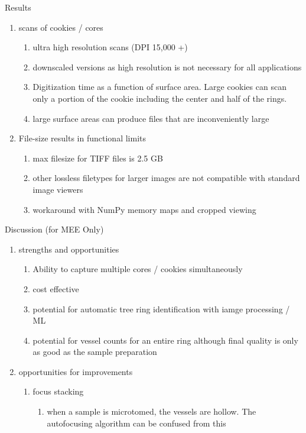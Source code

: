 \documentclass{article}
\begin{document}
\begin{outline}[enumerate]
\item Results
	\begin{enumerate}
	\item scans of cookies / cores
		\begin{enumerate}
		\item ultra high resolution scans (DPI 15,000 +)
		\item downscaled versions as high resolution is not necessary for all applications
		\item Digitization time as a function of surface area. Large cookies can scan only a portion of the cookie including the center and half of the rings.
		\item large surface areas can produce files that are inconveniently large
		\end{enumerate}
	\item File-size results in functional limits 
		\begin{enumerate}
		\item max filesize for TIFF files is 2.5 GB
		\item other lossless filetypes for larger images are not compatible with standard image viewers
		\item workaround with NumPy memory maps and cropped viewing 
		\end{enumerate}
	\end{enumerate}
\item Discussion (for MEE Only)
	\begin{enumerate}
	\item strengths and opportunities
		\begin{enumerate}
		\item  Ability to capture multiple cores / cookies simultaneously
		\item cost effective
		\item potential for automatic tree ring identification with iamge processing / ML 
		\item potential for vessel counts for an entire ring 
		\subitem although final quality is only as good as the sample preparation
		\end{enumerate}
	\item opportunities for improvements
		\begin{enumerate}
		\item focus stacking
			\begin {enumerate}
			\item when a sample is microtomed, the vessels are hollow. The autofocusing algorithm can be confused from this 

\end{enumerate}
\end{enumerate}
\end{enumerate}
\end{outline}
\end{document}
